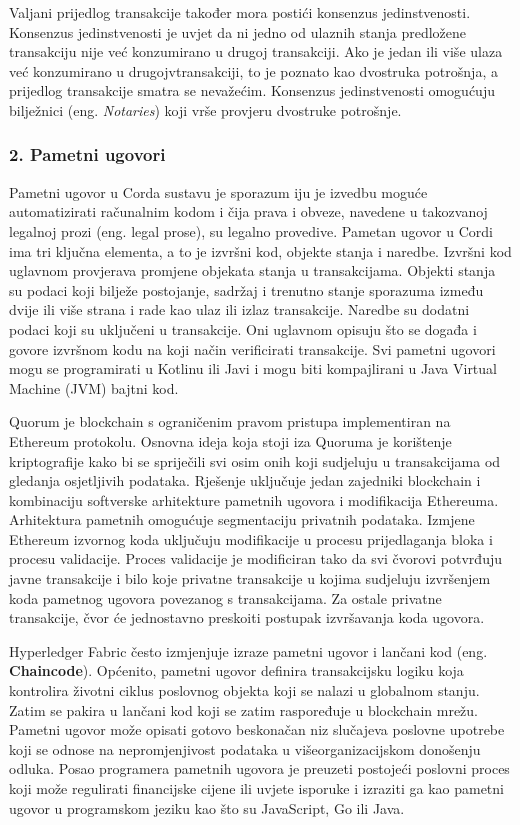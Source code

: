 \documentclass[times, utf8, diplomski]{fer}
\begin{document}
Valjani prijedlog transakcije također mora postići konsenzus jedinstvenosti. Konsenzus jedinstvenosti je uvjet da ni jedno od ulaznih stanja predložene transakciju nije već konzumirano u drugoj transakciji. Ako je jedan ili više ulaza već konzumirano u drugojvtransakciji, to je poznato kao dvostruka potrošnja, a prijedlog transakcije smatra se nevažećim. Konsenzus jedinstvenosti omogućuju bilježnici (eng. \textit{Notaries}) koji vrše provjeru dvostruke potrošnje.

\subsubsection{2.  Pametni ugovori}
Pametni ugovor u Corda sustavu je sporazum iju je izvedbu moguće automatizirati računalnim kodom i čija prava i obveze, navedene u takozvanoj legalnoj prozi (eng. legal prose), su legalno provedive. Pametan ugovor u Cordi ima tri ključna elementa, a to je izvršni kod, objekte stanja i naredbe. Izvršni kod uglavnom provjerava promjene objekata stanja u transakcijama. Objekti stanja su podaci koji bilježe postojanje, sadržaj i trenutno stanje sporazuma između dvije ili više strana i rade kao ulaz ili izlaz transakcije. Naredbe su dodatni podaci koji su uključeni u transakcije. Oni uglavnom opisuju što se događa i govore izvršnom kodu na koji način verificirati transakcije. Svi pametni ugovori mogu se programirati u Kotlinu ili Javi i mogu biti kompajlirani u Java Virtual Machine (JVM) bajtni kod.  \cite{smartcontract}

Quorum je blockchain s ograničenim pravom pristupa implementiran na Ethereum protokolu. Osnovna ideja koja stoji iza Quoruma je korištenje kriptografije kako bi se spriječili svi osim onih koji sudjeluju u transakcijama od gledanja osjetljivih podataka. Rješenje uključuje jedan zajedniki blockchain i kombinaciju softverske arhitekture pametnih ugovora i modifikacija Ethereuma. Arhitektura pametnih omogućuje segmentaciju privatnih podataka. Izmjene Ethereum izvornog koda uključuju modifikacije u procesu prijedlaganja bloka i procesu validacije. Proces validacije je modificiran tako da svi čvorovi potvrđuju javne transakcije i bilo koje privatne transakcije u kojima sudjeluju izvršenjem koda pametnog ugovora povezanog s transakcijama. Za ostale privatne transakcije, čvor će jednostavno preskoiti postupak izvršavanja koda ugovora.

Hyperledger Fabric često izmjenjuje izraze pametni ugovor i lančani kod (eng. \textbf{Chaincode}). Općenito, pametni ugovor definira transakcijsku logiku koja kontrolira životni ciklus poslovnog objekta koji se nalazi u globalnom stanju. Zatim se pakira u lančani kod koji se zatim raspoređuje u blockchain mrežu. Pametni ugovor može opisati gotovo beskonačan niz slučajeva poslovne upotrebe koji se odnose na nepromjenjivost podataka u višeorganizacijskom donošenju odluka. Posao programera pametnih ugovora je preuzeti postojeći poslovni proces koji može regulirati financijske cijene ili uvjete isporuke i izraziti ga kao pametni ugovor u programskom jeziku kao što su JavaScript, Go ili Java.
\end{document}
